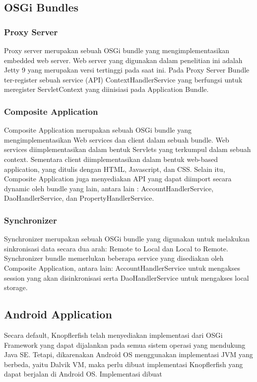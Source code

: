 \documentclass[conference]{IEEEtran}
\begin{document}
\subsection{OSGi Bundles}

\subsubsection{Proxy Server}
Proxy server merupakan sebuah OSGi bundle yang mengimplementasikan embedded web server. Web server yang digunakan dalam penelitian ini adalah Jetty 9 yang merupakan versi tertinggi pada saat ini. Pada Proxy Server Bundle ter-register sebuah service (API) ContextHandlerService yang berfungsi untuk meregister ServletContext yang diinisiasi pada Application Bundle.

\subsubsection{Composite Application}
Composite Application merupakan sebuah OSGi bundle yang mengimplementasikan Web services dan client dalam sebuah bundle. Web services diimplementasikan dalam bentuk Servlets yang terkumpul dalam sebuah context. Sementara client diimplementasikan dalam bentuk web-based application, yang ditulis dengan HTML, Javascript, dan CSS. Selain itu, Composite Application juga menyediakan API yang dapat diimport secara dynamic oleh bundle yang lain, antara lain : AccountHandlerService, DaoHandlerService, dan PropertyHandlerService.

\subsubsection{Synchronizer}
Synchronizer merupakan sebuah OSGi bundle yang digunakan untuk melakukan sinkronisasi data secara dua arah: Remote to Local dan Local to Remote. Synchronizer bundle memerlukan beberapa service yang disediakan oleh Composite Application, antara lain: AccountHandlerService untuk mengakses session yang akan disinkronisasi serta DaoHandlerService untuk mengakses local storage.




\subsection{Android Application}
Secara default, Knopflerfish telah menyediakan implementasi dari OSGi Framework yang dapat dijalankan pada semua sistem operasi yang mendukung Java SE. Tetapi, dikarenakan Android OS menggunakan implementasi JVM yang berbeda, yaitu Dalvik VM, maka perlu dibuat implementasi Knopflerfish yang dapat berjalan di Android OS. Implementasi dibuat 
\end{document}

